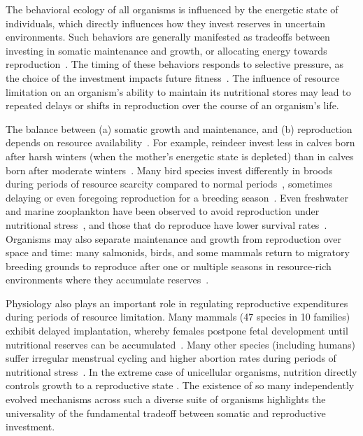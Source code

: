 \documentclass[twocolumn,preprintnumbers,amsmath,amssymb,superscriptaddress]{revtex4}
\begin{document}
\maketitle




The behavioral ecology of all organisms is influenced by the energetic state of individuals, which directly influences how they invest reserves in uncertain environments.
Such behaviors are generally manifested as tradeoffs between investing in somatic maintenance and growth, or allocating energy towards reproduction~\citep{Martin:1987dl,Kirk:1997cc,Kempes:2012hy}.
The timing of these behaviors responds to selective pressure, as the choice of the investment impacts future fitness~\citep{Mangel:1988uaa,Mangel:2014kz,Yeakel:2013hi}.
The influence of resource limitation on an organism's ability to maintain its nutritional stores may lead to repeated delays or shifts in reproduction over the course of an organism's life.

The balance between (a) somatic growth and maintenance, and (b) reproduction depends on resource availability~\citep{Morris:1987eo}.
For example, reindeer invest less in calves born after harsh winters (when the mother's energetic state is depleted) than in calves born after moderate winters~\citep{Tveraa:2003fq}.
Many bird species invest differently in broods during periods of resource scarcity compared to normal periods~\citep{Daan:1988va,Jacot:2009dv}, sometimes delaying or even foregoing reproduction for a breeding season~\citep{Martin:1987dl,Stearns:1989ip,Barboza:2002in}.
Even freshwater and marine zooplankton have been observed to avoid reproduction under nutritional stress~\citep{Threlkeld:1976ih}, and those that do reproduce have lower survival rates~\citep{Kirk:1997cc}.
Organisms may also separate maintenance and growth from reproduction over space and time: many salmonids, birds, and some mammals return to migratory breeding grounds to reproduce after one or multiple seasons in resource-rich environments where they accumulate reserves~\citep{Weber:1998jg,Mduma:1999cp,Moore:2014hi}.

Physiology also plays an important role in regulating reproductive expenditures during periods of resource limitation.
Many mammals (47 species in 10 families) exhibit delayed implantation, whereby females postpone fetal development until nutritional reserves can be accumulated~\citep{Mead:1989dt,Sandell:1990kw}.
Many other species (including humans) suffer irregular menstrual cycling and higher abortion rates during periods of nutritional stress~\citep{Bulik:1999eo,Trites:2003cc}.
In the extreme case of unicellular organisms, nutrition directly controls growth to a reproductive state \citep{Glazier:2009hq,Kempes:2012hy}. The existence of so many independently evolved mechanisms across such a diverse suite of organisms highlights the universality of the fundamental tradeoff between somatic and reproductive investment.
\end{document}
